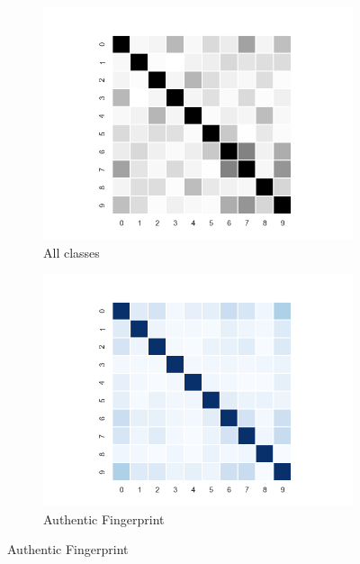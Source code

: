 \documentclass[english]{report}
\begin{document}
\begin{figure}[h!]
    \begin{subfigure}{0.3\textwidth}
        \includegraphics[scale=0.3]{../../images/feature_plot/heatmap_}
        \caption{All classes}

    \end{subfigure}
    \begin{subfigure}{0.3\textwidth}
        \includegraphics[scale=0.3]{../../images/feature_plot/heatmap_fingerprint_}
        \caption{Authentic Fingerprint}


\end{subfigure}
\end{figure}
\end{document}

